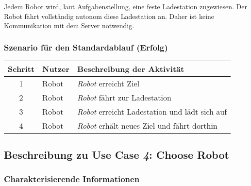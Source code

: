 			Jedem Robot wird, laut Aufgabenstellung, eine feste Ladestation zugewiesen. Der Robot fährt vollständig autonom diese Ladestation an. Daher ist keine Kommunikation mit dem Server notwendig.

			\subsubsection*{Szenario für den Standardablauf (Erfolg)}

			\begin{table}[H]
				\centering
				\begin{tabularx}{\textwidth}{@{}cp{2cm}X@{}}
				\toprule
				Schritt & Nutzer & Beschreibung der Aktivität \\ \midrule
				1 & Robot & \emph{Robot} erreicht Ziel \\
				2 & Robot & \emph{Robot} fährt zur Ladestation \\
				3 & Robot & \emph{Robot} erreicht Ladestation und lädt sich auf \\
				4 & Robot & \emph{Robot} erhält neues Ziel und fährt dorthin \\
				\bottomrule
				\end{tabularx}
			\end{table}

			
		\pagebreak

		\subsection{Beschreibung zu Use Case \emph{4}: Choose Robot}

			\subsubsection*{Charakterisierende Informationen}

